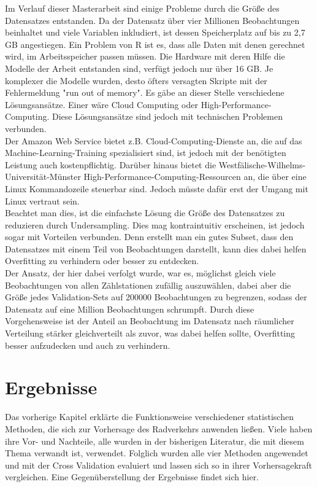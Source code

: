 \documentclass[a4paper,12pt]{thesis}
\begin{document}
Im Verlauf dieser Masterarbeit sind einige Probleme durch die Größe des Datensatzes entstanden. Da der Datensatz über vier Millionen Beobachtungen beinhaltet und viele Variablen inkludiert, ist dessen Speicherplatz auf bis zu 2,7 GB angestiegen. Ein Problem von R ist es, dass alle Daten mit denen gerechnet wird, im Arbeitsspeicher passen müssen. Die Hardware mit deren Hilfe die Modelle der Arbeit entstanden sind, verfügt jedoch nur über 16 GB. Je komplexer die Modelle wurden, desto öfters versagten Skripte mit der Fehlermeldung "run out of memory". Es gäbe an dieser Stelle verschiedene Lösungsansätze. Einer wäre Cloud Computing oder High-Performance-Computing. Diese Lösungsansätze sind jedoch mit technischen Problemen verbunden.\\ 
Der Amazon Web Service bietet z.B. Cloud-Computing-Dienste an, die auf das Machine-Learning-Training spezialisiert sind, ist jedoch mit der benötigten Leistung auch kostenpflichtig. Darüber hinaus bietet die Westfälische-Wilhelms-Universität-Münster High-Performance-Computing-Ressourcen an, die über eine Linux Kommandozeile steuerbar sind. Jedoch müsste dafür erst der Umgang mit Linux vertraut sein.\\
Beachtet man dies, ist die einfachste Lösung die Größe des Datensatzes zu reduzieren durch Undersampling. Dies mag kontraintuitiv erscheinen, ist jedoch sogar mit Vorteilen verbunden. Denn erstellt man ein gutes Subset, dass den Datensatzes mit einem Teil von Beobachtungen darstellt, kann dies dabei helfen Overfitting zu verhindern oder besser zu entdecken.\\
Der Ansatz, der hier dabei verfolgt wurde, war es, möglichst gleich viele Beobachtungen von allen Zählstationen zufällig auszuwählen, dabei aber die Größe jedes Validation-Sets auf 200000 Beobachtungen zu begrenzen, sodass der Datensatz auf eine Million Beobachtungen schrumpft. Durch diese Vorgehensweise ist der Anteil an Beobachtung im Datensatz nach räumlicher Verteilung stärker gleichverteilt als zuvor, was dabei helfen sollte, Overfitting besser aufzudecken und auch zu verhindern.

\chapter{Ergebnisse}

Das vorherige Kapitel erklärte die Funktionsweise verschiedener statistischen Methoden, die sich zur Vorhersage des Radverkehrs anwenden ließen. Viele haben ihre Vor- und Nachteile, alle wurden in der bisherigen Literatur, die mit diesem Thema verwandt ist, verwendet. Folglich wurden alle vier Methoden angewendet und mit der Cross Validation evaluiert und lassen sich so in ihrer Vorhersagekraft vergleichen. Eine Gegenüberstellung der Ergebnisse findet sich hier.
\end{document}
